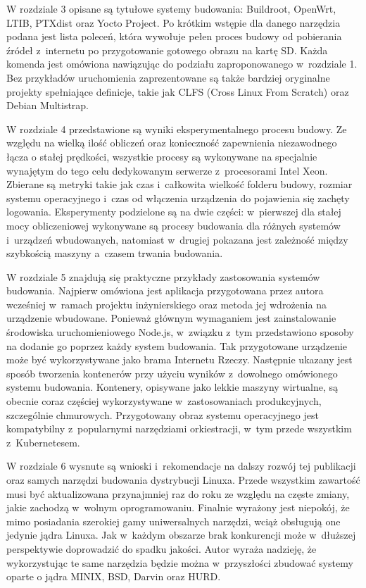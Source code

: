 \documentclass[printmode]{mgr}
\begin{document}
W rozdziale 3 opisane są tytułowe systemy budowania: Buildroot, OpenWrt, LTIB, PTXdist oraz Yocto Project.
Po krótkim wstępie dla danego narzędzia podana jest lista poleceń, która wywołuje pełen proces budowy od pobierania źródeł z~internetu po przygotowanie gotowego obrazu na kartę SD.
Każda komenda jest omówiona nawiązując do podziału zaproponowanego w~rozdziale 1.
Bez przykładów uruchomienia zaprezentowane są także bardziej oryginalne projekty spełniające definicje, takie jak CLFS (Cross Linux From Scratch) oraz Debian Multistrap.

W rozdziale 4 przedstawione są wyniki eksperymentalnego procesu budowy.
Ze względu na wielką ilość obliczeń oraz konieczność zapewnienia niezawodnego łącza o stałej prędkości, wszystkie procesy są wykonywane na specjalnie wynajętym do tego celu dedykowanym serwerze z~procesorami Intel Xeon.
Zbierane są metryki takie jak czas i~całkowita wielkość folderu budowy, rozmiar systemu operacyjnego i~czas od włączenia urządzenia do pojawienia się zachęty logowania.
Eksperymenty podzielone są na dwie części: w~pierwszej dla stałej mocy obliczeniowej wykonywane są procesy budowania dla różnych systemów i~urządzeń wbudowanych, natomiast w~drugiej pokazana jest zależność między szybkością maszyny a~czasem trwania budowania.

W rozdziale 5 znajdują się praktyczne przykłady zastosowania systemów budowania.
Najpierw omówiona jest aplikacja przygotowana przez autora wcześniej w~ramach projektu inżynierskiego oraz metoda jej wdrożenia na urządzenie wbudowane.
Ponieważ głównym wymaganiem jest zainstalowanie środowiska uruchomieniowego Node.js, w~związku z~tym przedstawiono sposoby na dodanie go poprzez każdy system budowania.
Tak przygotowane urządzenie może być wykorzystywane jako brama Internetu Rzeczy.
Następnie ukazany jest sposób tworzenia kontenerów przy użyciu wyników z~dowolnego omówionego systemu budowania.
Kontenery, opisywane jako lekkie maszyny wirtualne, są obecnie coraz częściej wykorzystywane w~zastosowaniach produkcyjnych, szczególnie chmurowych.
Przygotowany obraz systemu operacyjnego jest kompatybilny z~popularnymi narzędziami orkiestracji, w~tym przede wszystkim z~Kubernetesem.

W rozdziale 6 wysnute są wnioski i~rekomendacje na dalszy rozwój tej publikacji oraz samych narzędzi budowania dystrybucji Linuxa.
Przede wszystkim zawartość musi być aktualizowana przynajmniej raz do roku ze względu na częste zmiany, jakie zachodzą w~wolnym oprogramowaniu.
Finalnie wyrażony jest niepokój, że mimo posiadania szerokiej gamy uniwersalnych narzędzi, wciąż obsługują one jedynie jądra Linuxa.
Jak w~każdym obszarze brak konkurencji może w~dłuższej perspektywie doprowadzić do spadku jakości.
Autor wyraża nadzieję, że wykorzystując te same narzędzia będzie można w~przyszłości zbudować systemy oparte o jądra MINIX, BSD, Darvin oraz HURD.
\end{document}
